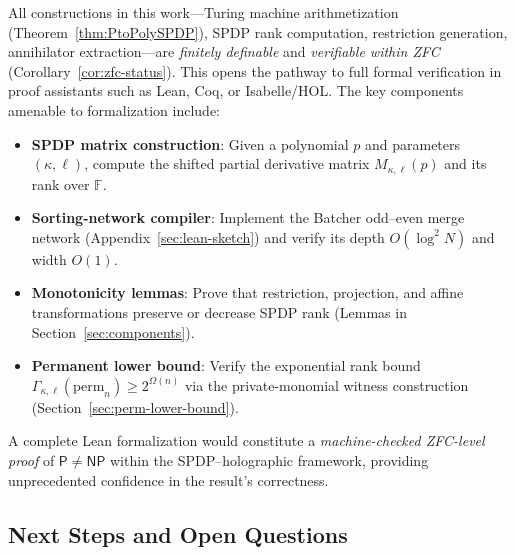 \documentclass[12pt]{article}
\theoremstyle{definition}
\theoremstyle{definition}
\theoremstyle{remark}
\theoremstyle{remark}
\begin{document}
All constructions in this work---Turing machine arithmetization (Theorem~\ref{thm:PtoPolySPDP}), SPDP rank computation, restriction generation, annihilator extraction---are \emph{finitely definable} and \emph{verifiable within ZFC} (Corollary~\ref{cor:zfc-status}). This opens the pathway to full formal verification in proof assistants such as Lean, Coq, or Isabelle/HOL. The key components amenable to formalization include:
\begin{itemize}
\item \textbf{SPDP matrix construction}: Given a polynomial $p$ and parameters $(\kappa,\ell)$, compute the shifted partial derivative matrix $M_{\kappa,\ell}(p)$ and its rank over $\mathbb{F}$.
\item \textbf{Sorting-network compiler}: Implement the Batcher odd--even merge network (Appendix~\ref{sec:lean-sketch}) and verify its depth $O(\log^2 N)$ and width $O(1)$.
\item \textbf{Monotonicity lemmas}: Prove that restriction, projection, and affine transformations preserve or decrease SPDP rank (Lemmas in Section~\ref{sec:components}).
\item \textbf{Permanent lower bound}: Verify the exponential rank bound $\Gamma_{\kappa,\ell}(\mathrm{perm}_n) \geq 2^{\Omega(n)}$ via the private-monomial witness construction (Section~\ref{sec:perm-lower-bound}).
\end{itemize}

A complete Lean formalization would constitute a \emph{machine-checked ZFC-level proof} of $\mathsf{P} \neq \mathsf{NP}$ within the SPDP--holographic framework, providing unprecedented confidence in the result's correctness.

\subsection{Next Steps and Open Questions}
\end{document}

